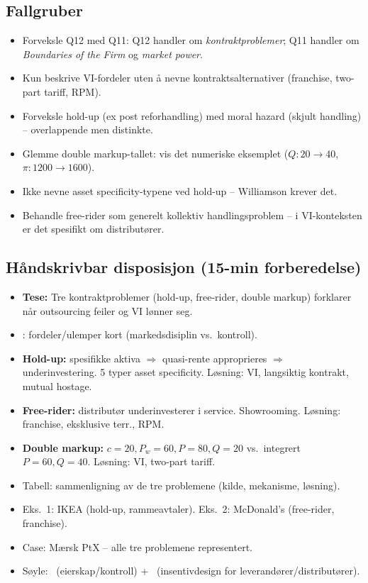 \subsection*{Fallgruber}
\begin{itemize}\setlength{\itemsep}{2pt}
\item Forveksle Q12 med Q11: Q12 handler om \emph{kontraktproblemer}; Q11 handler om \emph{Boundaries of the Firm} og \emph{market power}.
\item Kun beskrive VI-fordeler uten å nevne kontraktsalternativer (franchise, two-part tariff, RPM).
\item Forveksle hold-up (ex post reforhandling) med moral hazard (skjult handling) -- overlappende men distinkte.
\item Glemme double markup-tallet: vis det numeriske eksemplet ($Q: 20\to 40$, $\pi: 1200\to 1600$).
\item Ikke nevne asset specificity-typene ved hold-up -- Williamson krever det.
\item Behandle free-rider som generelt kollektiv handlingsproblem -- i VI-konteksten er det spesifikt om distributører.
\end{itemize}

\FloatBarrier
\subsection*{Håndskrivbar disposisjon (15-min forberedelse)}
\begin{itemize}\setlength{\itemsep}{2pt}
\item \textbf{Tese:} Tre kontraktproblemer (hold-up, free-rider, double markup) forklarer når outsourcing feiler og VI lønner seg.
\item {}: fordeler/ulemper kort (markedsdisiplin vs.\ kontroll).
\item \textbf{Hold-up:} spesifikke aktiva $\Rightarrow$ quasi-rente approprieres $\Rightarrow$ underinvestering. 5 typer asset specificity. Løsning: VI, langsiktig kontrakt, mutual hostage.
\item \textbf{Free-rider:} distributør underinvesterer i service. Showrooming. Løsning: franchise, eksklusive terr., RPM.
\item \textbf{Double markup:} $c=20, P_w=60, P=80, Q=20$ vs.\ integrert $P=60, Q=40$. Løsning: VI, two-part tariff.
\item Tabell: sammenligning av de tre problemene (kilde, mekanisme, løsning).
\item Eks.\ 1: IKEA (hold-up, rammeavtaler). Eks.\ 2: McDonald's (free-rider, franchise).
\item Case: Mærsk PtX -- alle tre problemene representert.
\item Søyle: \SOne\ (eierskap/kontroll) + \SThree\ (insentivdesign for leverandører/distributører).
\end{itemize}
